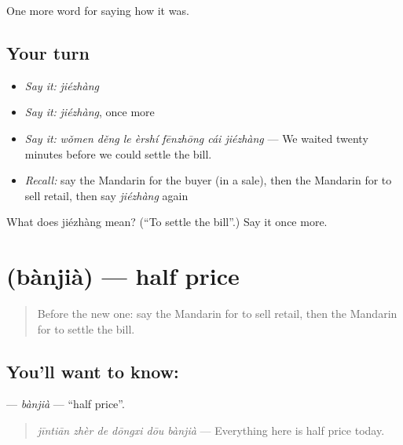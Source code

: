\begin{grammarlens}[title={What you've built}]
One more word for saying how it was.
\end{grammarlens}

\subsection*{Your turn}
\begin{itemize}
\raggedright
  \item \emph{Say it:} \emph{jiézhàng}
  \item \emph{Say it:} \emph{jiézhàng}, once more
  \item \emph{Say it:} \emph{wǒmen děng le èrshí fēnzhōng cái jiézhàng} — We waited twenty minutes before we could settle the bill.
  \item \emph{Recall:} say the Mandarin for the buyer (in a sale), then the Mandarin for to sell retail, then say \emph{jiézhàng} again
\end{itemize}

\begin{tcolorbox}[breakable,colback=teal!4,colframe=teal!35!black,title={Before you move on}]
What does jiézhàng mean? (\textquotedblleft{}To settle the bill\textquotedblright{}.) Say it once more.
\end{tcolorbox}
\section[\texorpdfstring{\zh{半价} (bànjià)}{半价 (bànjià)}]{ (bànjià) — half price}

\label{lesson:ZH-C524-banjia}



\begin{quote}
Before the new one: say the Mandarin for to sell retail, then the Mandarin for to settle the bill.
\end{quote}

\subsection*{You'll want to know: }
\textbf{} — \emph{bànjià} — \textquotedblleft{}half price\textquotedblright{}.

\begin{quote}
\textbf{} \emph{jīntiān zhèr de dōngxi dōu bànjià} — Everything here is half price today.
\end{quote}

